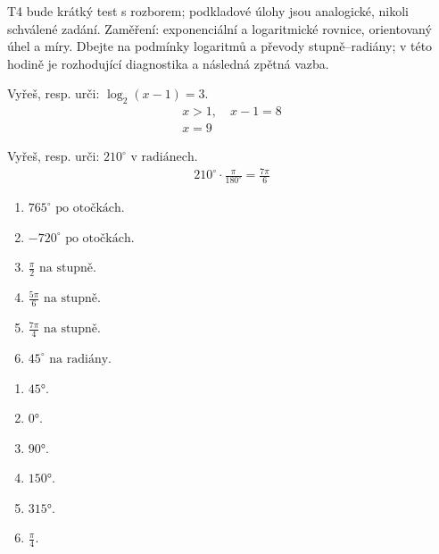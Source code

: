 \documentclass[11pt,a4paper]{article}
\begin{document}
T4 bude krátký test s rozborem; podkladové úlohy jsou analogické, nikoli schválené zadání. Zaměření: exponenciální a logaritmické rovnice, orientovaný úhel a míry.
Dbejte na podmínky logaritmů a převody stupně–radiány; v této hodině je rozhodující diagnostika a následná zpětná vazba.
\begin{prikladReseniBox}[title={Příklad 1}]
Vyřeš, resp. urči: $\log_2(x-1)=3$.
\tcblower
\[\begin{aligned}x>1,\quad x-1=8 \\ x=9\end{aligned}\]
\end{prikladReseniBox}
\begin{prikladReseniBox}[title={Příklad 2}]
Vyřeš, resp. urči: $210^\circ\text{ v radiánech}$.
\tcblower
\[\begin{aligned}210^\circ\cdot\frac{\pi}{180^\circ}=\frac{7\pi}{6}\end{aligned}\]
\end{prikladReseniBox}
\begin{zadaniReseniBox}[title={Samostatná práce 1}]
\begin{enumerate}[label=\alph*)]
\item $765^\circ\text{ po otočkách}$.
\item $-720^\circ\text{ po otočkách}$.
\item $\frac{\pi}{2}\text{ na stupně}$.
\item $\frac{5\pi}{6}\text{ na stupně}$.
\item $\frac{7\pi}{4}\text{ na stupně}$.
\item $45^\circ\text{ na radiány}$.
\end{enumerate}
\tcblower
\begin{enumerate}[label=\alph*)]
\item $45°$.
\item $0°$.
\item $90°$.
\item $150°$.
\item $315°$.
\item $\frac{\pi}{4}$.
\end{enumerate}
\end{zadaniReseniBox}
\end{document}
